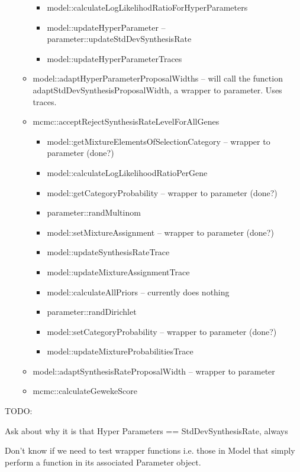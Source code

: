 \documentclass[12pt,hyperref]{labbook}
\newcommand{\sep}{\discretionary{}{}{}} %
\begin{document}
\begin{itemize}
\begin{itemize}
\begin{itemize}
            \item model::calculateLogLikelihodRatioForHyperParameters
            \item model::updateHyperParameter -- parameter::updateStdDevSynthesisRate
            \item model::updateHyperParameterTraces
        \end{itemize}
        \item model::\sep adapt\sep Hyper\sep Parameter\sep Proposal\sep Widths -- 
        will call the function adapt\sep Std\sep Dev\sep Synthesis\sep Proposal\sep Width, 
        a wrapper to parameter. Uses traces.
        \item mcmc::acceptRejectSynthesisRateLevelForAllGenes
        \begin{itemize}
            \item model::\sep get\sep Mixture\sep Elements\sep Of\sep Selection\sep Category 
            -- wrapper to parameter (done?)
            \item model::calculateLogLikelihoodRatioPerGene
            \item model::getCategoryProbability -- wrapper to parameter (done?)
            \item parameter::randMultinom
            \item model::setMixtureAssignment -- wrapper to parameter (done?)
            \item model::updateSynthesisRateTrace
            \item model::updateMixtureAssignmentTrace
            \item model::calculateAllPriors -- currently does nothing
            \item parameter::randDirichlet
            \item model::setCategoryProbability -- wrapper to parameter (done?)
            \item model::updateMixtureProbabilitiesTrace
        \end{itemize}
        \item model::adaptSynthesisRateProposalWidth -- wrapper to parameter
        \item mcmc::calculateGewekeScore
    \end{itemize}
\end{itemize}

TODO:

Ask about why it is that Hyper Parameters == StdDevSynthesisRate, always

Don't know if we need to test wrapper functions i.e. those in Model that simply perform
a function in its associated Parameter object.
\end{document}
